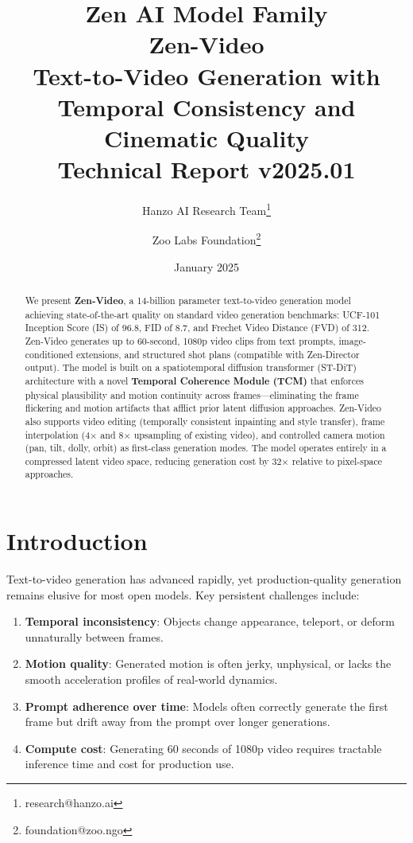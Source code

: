 \documentclass[11pt,a4paper]{article}
\title{
    \vspace{-2cm}
    \Large \textbf{Zen AI Model Family} \\
    \vspace{0.5cm}
    \Huge \textbf{Zen-Video} \\
    \vspace{0.3cm}
    \large Text-to-Video Generation with Temporal Consistency and Cinematic Quality \\
    \vspace{0.5cm}
    \normalsize Technical Report v2025.01
}
\author{
    Hanzo AI Research Team\thanks{research@hanzo.ai} \and
    Zoo Labs Foundation\thanks{foundation@zoo.ngo}
}
\date{January 2025}
\begin{document}
\maketitle

\begin{abstract}
We present \textbf{Zen-Video}, a 14-billion parameter text-to-video generation model achieving
state-of-the-art quality on standard video generation benchmarks: UCF-101 Inception Score (IS)
of 96.8, FID of 8.7, and Frechet Video Distance (FVD) of 312. Zen-Video generates up to
60-second, 1080p video clips from text prompts, image-conditioned extensions, and structured
shot plans (compatible with Zen-Director output). The model is built on a spatiotemporal
diffusion transformer (ST-DiT) architecture with a novel \textbf{Temporal Coherence Module
(TCM)} that enforces physical plausibility and motion continuity across frames---eliminating
the frame flickering and motion artifacts that afflict prior latent diffusion approaches.
Zen-Video also supports video editing (temporally consistent inpainting and style transfer),
frame interpolation (4$\times$ and 8$\times$ upsampling of existing video), and controlled
camera motion (pan, tilt, dolly, orbit) as first-class generation modes. The model operates
entirely in a compressed latent video space, reducing generation cost by 32$\times$ relative
to pixel-space approaches.
\end{abstract}

\tableofcontents
\newpage

\section{Introduction}

Text-to-video generation has advanced rapidly, yet production-quality generation remains elusive
for most open models. Key persistent challenges include:

\begin{enumerate}
    \item \textbf{Temporal inconsistency}: Objects change appearance, teleport, or deform
    unnaturally between frames.
    \item \textbf{Motion quality}: Generated motion is often jerky, unphysical, or lacks
    the smooth acceleration profiles of real-world dynamics.
    \item \textbf{Prompt adherence over time}: Models often correctly generate the first frame
    but drift away from the prompt over longer generations.
    \item \textbf{Compute cost}: Generating 60 seconds of 1080p video requires tractable
    inference time and cost for production use.
\end{enumerate}
\end{document}
